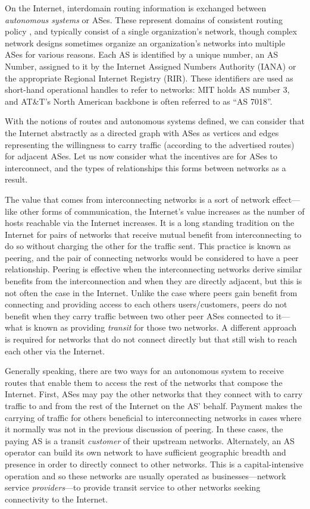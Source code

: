 On the Internet, interdomain routing information is exchanged between
\emph{autonomous systems} or ASes. These represent domains of consistent
routing policy \cite{rfc1930}, and typically consist of a single organization's
network, though complex network designs sometimes organize an organization's
networks into multiple ASes for various reasons. Each AS is identified by a
unique number, an AS Number, assigned to it by the Internet Assigned Numbers
Authority (IANA) or the appropriate Regional Internet Registry (RIR). These
identifiers are used as short-hand operational handles to refer to networks:
MIT holds AS number 3, and AT\&T's North American backbone is often referred to
as ``AS 7018''.

With the notions of routes and autonomous systems defined, we can consider that
the Internet abstractly as a directed graph with ASes as vertices and edges
representing the willingness to carry traffic (according to the advertised
routes) for adjacent ASes. Let us now consider what the incentives are for ASes
to interconnect, and the types of relationships this forms between networks as
a result.

The value that comes from interconnecting networks is a sort of network
effect---like other forms of communication, the Internet's value increases as
the number of hosts reachable via the Internet increases. It is a long standing
tradition on the Internet for pairs of networks that receive mutual benefit
from interconnecting to do so without charging the other for the traffic sent.
This practice is known as peering, and the pair of connecting networks would be
considered to have a peer relationship. Peering is effective when the
interconnecting networks derive similar benefits from the interconnection and
when they are directly adjacent, but this is not often the case in the
Internet. Unlike the case where peers gain benefit from connecting and
providing access to each others users/customers, peers do not benefit when they
carry traffic between two other peer ASes connected to it---what is known as
providing \emph{transit} for those two networks. A different approach is
required for networks that do not connect directly but that still wish to reach
each other via the Internet.

Generally speaking, there are two ways for an autonomous system to receive
routes that enable them to access the rest of the networks that compose the
Internet. First, ASes may pay the other networks that they connect with to
carry traffic to and from the rest of the Internet on the AS' behalf. Payment
makes the carrying of traffic for others beneficial to interconnecting networks
in cases where it normally was not in the previous discussion of peering. In
these cases, the paying AS is a transit \emph{customer} of their upstream
networks. Alternately, an AS operator can build its own network to have
sufficient geographic breadth and presence in order to directly connect to
other networks. This is a capital-intensive operation and so these networks are
usually operated as businesses---network service \emph{providers}---to provide
transit service to other networks seeking connectivity to the Internet.

